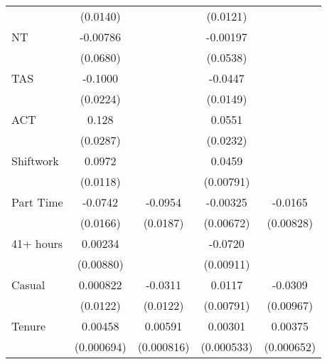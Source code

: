 {\begin{tabular}{l*{4}{c}}
                    &    (0.0140)         &                     &    (0.0121)         &                     \\
[1em]
NT                  &    -0.00786         &                     &    -0.00197         &                     \\
                    &    (0.0680)         &                     &    (0.0538)         &                     \\
[1em]
TAS                 &     -0.1000\sym{***}&                     &     -0.0447\sym{**} &                     \\
                    &    (0.0224)         &                     &    (0.0149)         &                     \\
[1em]
ACT                 &       0.128\sym{***}&                     &      0.0551\sym{*}  &                     \\
                    &    (0.0287)         &                     &    (0.0232)         &                     \\
[1em]
Shiftwork           &      0.0972\sym{***}&                     &      0.0459\sym{***}&                     \\
                    &    (0.0118)         &                     &   (0.00791)         &                     \\
[1em]
Part Time           &     -0.0742\sym{***}&     -0.0954\sym{***}&    -0.00325         &     -0.0165\sym{*}  \\
                    &    (0.0166)         &    (0.0187)         &   (0.00672)         &   (0.00828)         \\
[1em]
41+ hours           &     0.00234         &                     &     -0.0720\sym{***}&                     \\
                    &   (0.00880)         &                     &   (0.00911)         &                     \\
[1em]
Casual              &    0.000822         &     -0.0311\sym{*}  &      0.0117         &     -0.0309\sym{**} \\
                    &    (0.0122)         &    (0.0122)         &   (0.00791)         &   (0.00967)         \\
[1em]
Tenure              &     0.00458\sym{***}&     0.00591\sym{***}&     0.00301\sym{***}&     0.00375\sym{***}\\
                    &  (0.000694)         &  (0.000816)         &  (0.000533)         &  (0.000652)         \\

\end{tabular}}
